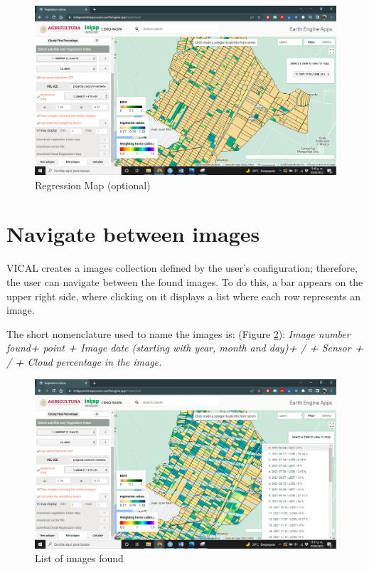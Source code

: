 \documentclass[
]{book}
\begin{document}
\begin{figure}

{\centering \includegraphics[width=0.85\linewidth]{./images/Figure54} 

}

\caption{Regression Map (optional)}\label{fig:figI4}
\end{figure}

\hypertarget{navigate-between-images}{%
\section{Navigate between images}\label{navigate-between-images}}

VICAL creates a images collection defined by the user's configuration; therefore, the user can navigate between the found images. To do this, a bar appears on the upper right side, where clicking on it displays a list where each row represents an image.

The short nomenclature used to name the images is: (Figure \ref{fig:figI5}): \emph{Image number found\textbf{+} point \textbf{+} Image date (starting with year, month and day)\textbf{+} / \textbf{+} Sensor \textbf{+} / \textbf{+} Cloud percentage in the image.}

\begin{figure}

{\centering \includegraphics[width=0.85\linewidth]{./images/Figure55} 

}

\caption{List of images found}\label{fig:figI5}
\end{figure}
\end{document}
